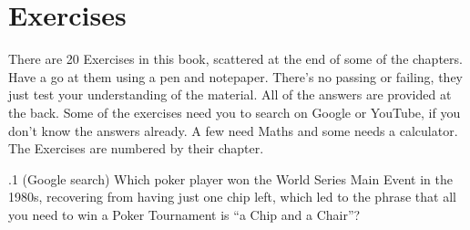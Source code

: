 \section*{Exercises}


There are 20 Exercises in this book, scattered at the end of some of
the chapters. Have a go at them using a pen and notepaper. There's no
passing or failing, they just test your understanding of the
material. All of the answers are provided at the back. Some of the
exercises need you to search on Google or YouTube, if you don't know
the answers already. A few need Maths and some needs a calculator. The
Exercises are numbered by their chapter.

.1 (Google search) Which poker player won the World
Series Main Event in the 1980s, recovering from having just one chip
left, which led to the phrase that all you need to win a Poker
Tournament is ``a Chip and a Chair''?

